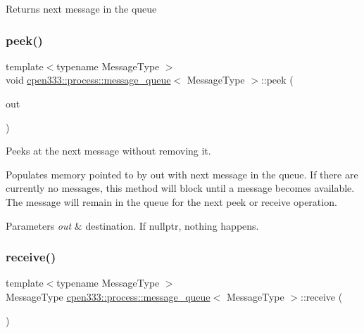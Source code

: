 \begin{DoxyReturn}{Returns}
next message in the queue 
\end{DoxyReturn}
\mbox{\label{classcpen333_1_1process_1_1message__queue_a0d6f0bb9911b01f601bb67551007be3d}} 
\subsubsection{\texorpdfstring{peek()}{peek()}\hspace{0.1cm}{\footnotesize\ttfamily [2/2]}}
{\footnotesize\ttfamily template$<$typename Message\+Type $>$ \\
void \hyperlink{classcpen333_1_1process_1_1message__queue}{cpen333\+::process\+::message\+\_\+queue}$<$ Message\+Type $>$\+::peek (\begin{DoxyParamCaption}\item[{Message\+Type $\ast$}]{out }\end{DoxyParamCaption})\hspace{0.3cm}{\ttfamily [inline]}}



Peeks at the next message without removing it. 

Populates memory pointed to by {\ttfamily out} with next message in the queue. If there are currently no messages, this method will block until a message becomes available. The message will remain in the queue for the next {\ttfamily peek} or {\ttfamily receive} operation.


\begin{DoxyParams}{Parameters}
{\em out} & destination. If {\ttfamily nullptr}, nothing happens. \\
\hline
\end{DoxyParams}
\mbox{\label{classcpen333_1_1process_1_1message__queue_a39d2e54480fba6a441e70cb1362d3900}} 
\subsubsection{\texorpdfstring{receive()}{receive()}\hspace{0.1cm}{\footnotesize\ttfamily [1/2]}}
{\footnotesize\ttfamily template$<$typename Message\+Type $>$ \\
Message\+Type \hyperlink{classcpen333_1_1process_1_1message__queue}{cpen333\+::process\+::message\+\_\+queue}$<$ Message\+Type $>$\+::receive (\begin{DoxyParamCaption}{ }\end{DoxyParamCaption})\hspace{0.3cm}{\ttfamily [inline]}}



